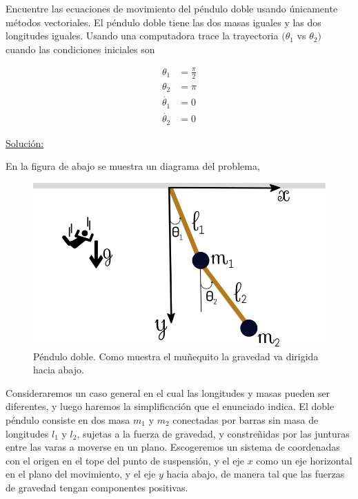 \documentclass[a4paper,10pt]{article}
\numberwithin{equation}{section}
\begin{document}
Encuentre las ecuaciones de movimiento del péndulo doble usando únicamente métodos 
vectoriales. El péndulo doble tiene las dos masas iguales y las dos longitudes iguales.
Usando una computadora trace la trayectoria $(\theta_1$ vs $\theta_2)$ cuando las 
condiciones iniciales son

\begin{align*}
 \theta_1 &= \frac{\pi}{2} \\
 \theta_2 &= \pi \\
 \dot{\theta_1} &= 0 \\
 \dot{\theta_2} &= 0 
\end{align*}

\vspace{.3cm}

\underline{Solución:} \vspace{.3cm}

En la figura de abajo se muestra un diagrama del problema, 

\begin{figure}[H]
\center
\includegraphics[scale=0.4]{problema2fig1}
\caption{Péndulo doble. Como muestra el muñequito la gravedad va dirigida hacia 
abajo.}
\label{fig:problema2fig1}
\end{figure}


Consideraremos un caso general en el cual las longitudes y masas pueden ser diferentes,
y luego haremos la simplificación que el enunciado indica. El doble péndulo consiste 
en dos masa $m_1$ y $m_2$ conectadas por barras sin masa de longitudes $l_1$ y $l_2$,
sujetas a la fuerza de gravedad, y constreñidas por las junturas entre las varas
a moverse en un plano. Escogeremos un sistema de coordenadas con el origen en el 
tope del punto de suspensión, y el eje $x$ como un eje horizontal en el plano del 
movimiento, y el eje $y$ hacia abajo, de manera tal que las fuerzas de gravedad 
tengan componentes positivas.
\end{document}
